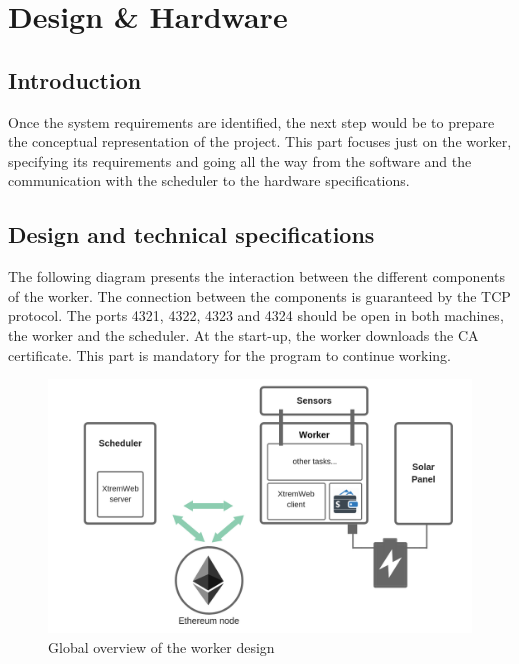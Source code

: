 

\chapter{Design \& Hardware}

\section{Introduction}
    Once the system requirements are identified, the next step would be to prepare the conceptual representation
    of the project. This part focuses just on the worker, specifying its requirements and going all the way
    from the software and the communication with the scheduler to the hardware specifications.

\section{Design and technical specifications}

    The following diagram presents the interaction between the different components of the worker.
    The connection between the components is guaranteed by the TCP protocol.
    The ports 4321, 4322, 4323 and 4324 should be open in both machines, the worker and the scheduler.
    At the start-up, the worker downloads the CA certificate. This part is mandatory for the program
    to continue working.

    \clearpage

    \begin{figure}[!h]\centering
        \includegraphics[width=.9\columnwidth]{5-Design/figs/worker-diagram.png}
        \caption{Global overview of the worker design}
    \end{figure}

